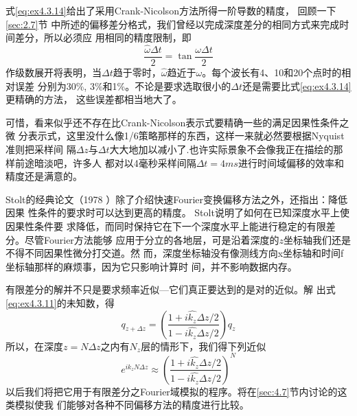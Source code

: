 式\ref{eq:ex4.3.14}给出了采用Crank-Nicolson方法所得一阶导数的精度，
回顾一下\ref{sec:2.7}节
中所述的偏移差分格式，我们曾经以完成深度差分的相同方式来完成时间差分，所以必须应
用相同的精度限制，即
\begin{equation}
\frac{\hat{\omega}\Delta t}{2}=\tan\frac{\omega \Delta t}{2}
\label{eq:ex4.3.15}
\end{equation}
作级数展开将表明，当$\Delta t$趋于零时，$\hat{\omega}$趋近于$\omega$。每个波长有4、10和20个点时的相对误差
分别为30\%, 3\%和1\%。不论是要求选取很小的$\Delta t$还是需要比式\ref{eq:ex4.3.14}更精确的方法， 这些误差都相当地大了。

可惜，看来似乎还不存在比Crank-Nicolson表示式要精确一些的满足因果性条件之微
分表示式，这里没什么像1/6策略那样的东西，这样一来就必然要根据Nyquist准则把采样间
隔$\Delta z$与$\Delta t$大大地加以减小了.也许实际景象不会像我正在描绘的那样前途暗淡吧，许多人
都对以4毫秒采样间隔$\Delta t = 4ms$进行时间域偏移的效率和精度还是满意的。

Stolt的经典论文（1978
）除了介绍快速Fourier变换偏移方法之外，还指出：降低因果
性条件的要求时可以达到更高的精度。
Stolt说明了如何在已知深度水平上使因果性条件要
求降低，而同时保持它在下一个深度水平上能进行稳定的有限差分。尽管Fourier方法能够
应用于分立的各地层，可是沿着深度的$z$坐标轴我们还是不得不同因果性微分打交道。然
而，深度坐标轴没有像测线方向x坐标轴和时间f坐标轴那样的麻烦事，因为它只影响计算时
间，并不影响数据内存。

有限差分的解并不只是要求频率近似---它们真正要达到的是对的近似。解
出式\ref{eq:ex4.3.11}的未知数，得
\begin{equation}
q_{z+\Delta z}=(\frac{1+i\hat{k_z}\Delta z/2}{1-i\hat{k_z}\Delta z/2})q_z
\label{eq:ex4.3.16}
\end{equation}
所以，在深度$z=N\Delta z$之内有$N_z$层的情形下，我们得下列近似
\begin{equation}
e^{ik_zN\Delta z}\approx(\frac{1+i\hat{k_z}\Delta z/2}{1-i\hat{k_z}\Delta z/2})^N
\label{eq:ex4.3.17}
\end{equation}
以后我们将把它用于有限差分之Fourier域模拟的程序。将在\ref{sec:4.7}节内讨论的这类模拟使我
们能够对各种不同偏移方法的精度进行比较。



